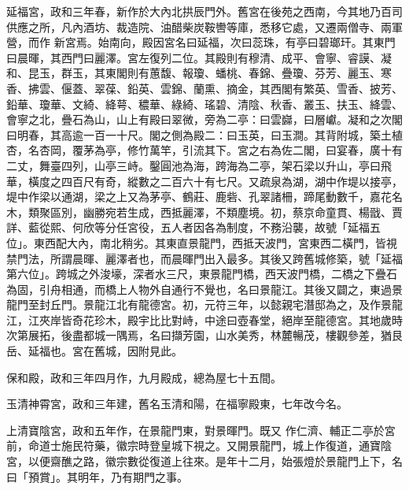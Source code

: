 \begin{pinyinscope}
 延福宮，政和三年春，新作於大內北拱辰門外。舊宮在後苑之西南，今其地乃百司供應之所，凡內酒坊、裁造院、油醋柴炭鞍轡等庫，悉移它處，又遷兩僧寺、兩軍營，而作
 新宮焉。始南向，殿因宮名曰延福，次曰蕊珠，有亭曰碧瑯玕。其東門曰晨暉，其西門曰麗澤。宮左復列二位。其殿則有穆清、成平、會寧、睿謨、凝和、昆玉，群玉，其東閣則有蕙馥、報瓊、蟠桃、春錦、疊瓊、芬芳、麗玉、寒香、拂雲、偃蓋、翠葆、鉛英、雲錦、蘭熏、摘金，其西閣有繁英、雪香、披芳、鉛華、瓊華、文綺、絳萼、穠華、綠綺、瑤碧、清陰、秋香、叢玉、扶玉、絳雲、會寧之北，疊石為山，山上有殿曰翠微，旁為二亭：曰雲巋，曰層巘。凝和之次閣曰明春，其高逾一百一十尺。閣之側為殿二：曰玉英，曰玉澗。其背附城，築土植杏，名杏岡，覆茅為亭，修竹萬竿，引流其下。宮之右為佐二閣，曰宴春，廣十有二丈，舞臺四列，山亭三峙。鑿圓池為海，跨海為二亭，架石梁以升山，亭曰飛華，橫度之四百尺有奇，縱數之二百六十有七尺。又疏泉為湖，湖中作堤以接亭，堤中作梁以通湖，梁之上又為茅亭、鶴莊、鹿砦、孔翠諸柵，蹄尾動數千，嘉花名木，類聚區別，幽勝宛若生成，西抵麗澤，不類塵境。初，蔡京命童貫、楊戩、賈
 詳、藍從熙、何欣等分任宮役，五人者因各為制度，不務沿襲，故號「延福五位」。東西配大內，南北稍劣。其東直景龍門，西抵天波門，宮東西二橫門，皆視禁門法，所謂晨暉、麗澤者也，而晨暉門出入最多。其後又跨舊城修築，號「延福第六位」。跨城之外浚壕，深者水三尺，東景龍門橋，西天波門橋，二橋之下疊石為固，引舟相通，而橋上人物外自通行不覺也，名曰景龍江。其後又闢之，東過景龍門至封丘門。景龍江北有龍德宮。初，元符三年，以懿親宅潛邸為之，及作景龍江，江夾岸皆奇花珍木，殿宇比比對峙，中途曰壺春堂，絕岸至龍德宮。其地歲時次第展拓，後盡都城一隅焉，名曰擷芳園，山水美秀，林麓暢茂，樓觀參差，猶艮岳、延福也。宮在舊城，因附見此。



 保和殿，政和三年四月作，九月殿成，總為屋七十五間。



 玉清神霄宮，政和三年建，舊名玉清和陽，在福寧殿東，七年改今名。



 上清寶陰宮，政和五年作，在景龍門東，對景暉門。既又
 作仁濟、輔正二亭於宮前，命道士施民符藥，徽宗時登皇城下視之。又開景龍門，城上作復道，通寶陰宮，以便齋醮之路，徽宗數從復道上往來。是年十二月，始張燈於景龍門上下，名曰「預賞」。其明年，乃有期門之事。




\end{pinyinscope}
